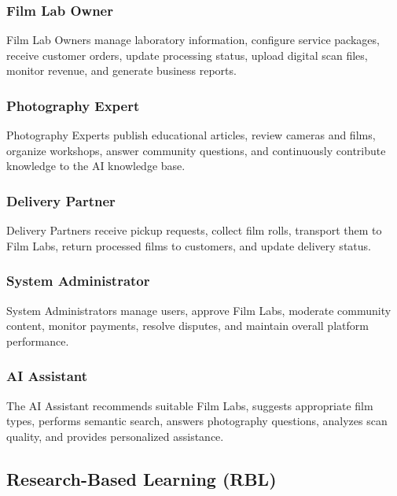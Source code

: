 \documentclass[12pt,a4paper]{article}
\begin{document}
	\subsubsection{Film Lab Owner}
	
	Film Lab Owners manage laboratory information, configure service packages, receive customer orders, update processing status, upload digital scan files, monitor revenue, and generate business reports.
	
	\subsubsection{Photography Expert}
	
	Photography Experts publish educational articles, review cameras and films, organize workshops, answer community questions, and continuously contribute knowledge to the AI knowledge base.
	
	\subsubsection{Delivery Partner}
	
	Delivery Partners receive pickup requests, collect film rolls, transport them to Film Labs, return processed films to customers, and update delivery status.
	
	\subsubsection{System Administrator}
	
	System Administrators manage users, approve Film Labs, moderate community content, monitor payments, resolve disputes, and maintain overall platform performance.
	
	\subsubsection{AI Assistant}
	
	The AI Assistant recommends suitable Film Labs, suggests appropriate film types, performs semantic search, answers photography questions, analyzes scan quality, and provides personalized assistance.
	
	
	\subsection{Research-Based Learning (RBL)}
	
\end{document}

